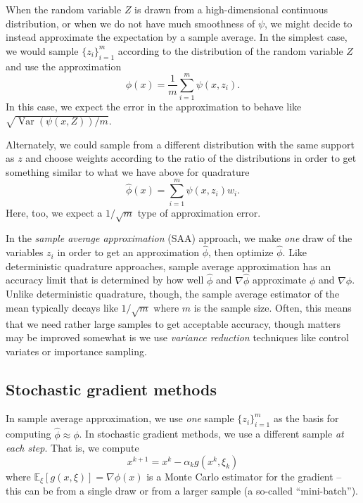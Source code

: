 \documentclass[12pt, leqno]{article} %
\begin{document}
When the random variable \(Z\) is drawn from a high-dimensional
continuous distribution, or when we do not have much smoothness of
\(\psi\), we might decide to instead approximate the expectation by a
sample average. In the simplest case, we would sample
\(\{z_i\}_{i=1}^m\) according to the distribution of the random variable
\(Z\) and use the approximation
\[\hat{\phi}(x) = \frac{1}{m} \sum_{i=1}^m \psi(x, z_i).\] In this case,
we expect the error in the approximation to behave like
\(\sqrt{\operatorname{Var}(\psi(x, Z))/m}\).

Alternately, we could sample from a different distribution with the same
support as \(z\) and choose weights according to the ratio of the
distributions in order to get something similar to what we have above
for quadrature \[\hat{\phi}(x) = \sum_{i=1}^m \psi(x, z_i) w_i.\] Here,
too, we expect a \(1/\sqrt{m}\) type of approximation error.

In the \emph{sample average approximation} (SAA) approach, we make
\emph{one} draw of the variables \(z_i\) in order to get an
approximation \(\hat{\phi}\), then optimize \(\hat{\phi}\). Like
deterministic quadrature approaches, sample average approximation has an
accuracy limit that is determined by how well \(\hat{\phi}\) and
\(\nabla \hat{\phi}\) approximate \(\phi\) and \(\nabla \phi\). Unlike
deterministic quadrature, though, the sample average estimator of the
mean typically decays like \(1/\sqrt{m}\) where \(m\) is the sample
size. Often, this means that we need rather large samples to get
acceptable accuracy, though matters may be improved somewhat is we use
\emph{variance reduction} techniques like control variates or importance
sampling.

\subsection{Stochastic gradient methods}

In sample average approximation, we use \emph{one} sample
\(\{z_i\}_{i=1}^m\) as the basis for computing
\(\hat{\phi} \approx \phi\). In stochastic gradient methods, we use a
different sample \emph{at each step}. That is, we compute
\[x^{k+1} = x^k - \alpha_k g(x^k, \xi_k)\] where
\(\mathbb{E}_\xi[g(x, \xi)] = \nabla \phi(x)\) is a Monte Carlo
estimator for the gradient -- this can be from a single draw or from a
larger sample (a so-called ``mini-batch'').
\end{document}
